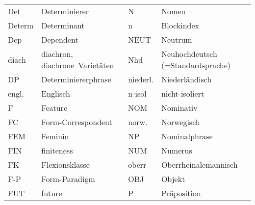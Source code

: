 \begin{tabularx}{\textwidth}{lXlX}
Det        &    Determinierer &                                    N        &   Nomen\\
Determ        &    Determinant &                                   n        &    Blockindex \\
Dep        &    Dependent &                                        NEUT        &    Neutrum \\
diach        &    diachron, \mbox{diachrone Varietäten} &          Nhd        &    Neuhochdeutsch (=Standardsprache) \\
DP        &    Determiniererphrase &                               niederl.        &    Niederländisch \\
engl.        &    Englisch &                                       n-isol          &      nicht-isoliert \\
F        &    Feature &                                            NOM          &      Nominativ \\
FC        &    Form-Correspondent &                                norw.          &      Norwegisch \\
FEM        &    Feminin &                                          NP          &      Nominalphrase \\
FIN        &    finiteness &                                       NUM          &      Numerus \\
FK        &    Flexionsklasse &                                    oberr          &      Oberrheinalemannisch \\
F-P        &    Form-Paradigm &                                    OBJ          &      Objekt \\
FUT        &    future &                                           P          &      Präposition \\
\end{tabularx}\clearpage
